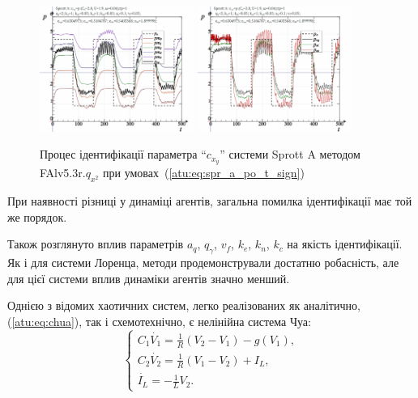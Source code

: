 \documentclass[a4paper,13pt]{atuaref}
\begin{document}
\begin{figure}[ht!]
  \centerline{
    \includegraphics[width=0.45\textwidth]{p5/p/cha/spr_a/FAlv5.3A/sprott_a_FAlv5x3r-pl_n_sign.png}
    \hfill
    \includegraphics[width=0.45\textwidth]{p5/p/cha/spr_a/FAlv5.3A/sprott_a_FAlv5x3r-p_p_sign.png}
  }
  \caption{Процес ідентифікації параметра ``$c_{x_y}$'' системи Sprott A методом FAlv5.3r.$q_{x^2}$ при умовах~(\ref{atu:eq:spr_a_po_t_sign})}
  \label{atu:f:spr_a_id_FAlv5.3r.q_x2_sign}
\end{figure}

При наявності різниці у динаміці агентів, загальна помилка ідентифікації
має той же порядок.

Також розглянуто вплив параметрів $a_q$, $q_\gamma$, $v_f$, $k_e$, $k_n$, $k_c$
на якість ідентифікації. Як і для системи Лоренца, методи
продемонстрували достатню робасність, але для цієї системи
вплив динаміки агентів значно менший.

Однією з відомих хаотичних систем, легко реалізованих як аналітично,
(\ref{atu:eq:chua}), так і схемотехнічно, є нелінійна система Чуа:
%
\begin{equation}
\begin{cases}
  C_1 \dot{V_1}  = \frac{1}{R} ( V_2 - V_1 ) - g(V_1), \\
  C_2 \dot{V_2}  = \frac{1}{R} ( V_1 - V_2 ) + I_L, \\
  \dot{I_L}      = - \frac{1}{L} V_2 .
\end{cases}
\label{atu:eq:chua}
\end{equation}
\end{document}
